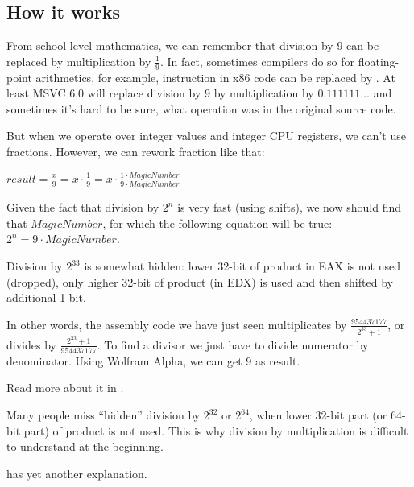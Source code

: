﻿\subsection{How it works}

From school-level mathematics, we can remember that division by 9 can be replaced by multiplication by $\frac{1}{9}$.
In fact, sometimes compilers do so for floating-point arithmetics, for example,  instruction in x86 code
can be replaced by .
At least MSVC 6.0 will replace division by 9 by multiplication by $0.111111...$ and sometimes it's hard to be sure,
what operation was in the original source code.

But when we operate over integer values and integer CPU registers, we can't use fractions.
However, we can rework fraction like that:

\begin{center}
$result = \frac{x}{9} = x \cdot \frac{1}{9} = x \cdot \frac{1 \cdot MagicNumber}{9 \cdot MagicNumber}$
\end{center}

Given the fact that division by $2^n$ is very fast (using shifts), we now should find that $MagicNumber$,
for which the following
equation will be true: $2^n = 9 \cdot MagicNumber$.

Division by $2^{33}$ is somewhat hidden: lower 32-bit of product in EAX is not used (dropped), only higher 32-bit of
product (in EDX) is used and then shifted by additional 1 bit.

In other words, the assembly code we have just seen multiplicates by {\Large $\frac{954437177}{{2^{33}+1}}$},
or divides by {\Large $\frac{{2^{33}+1}}{954437177}$}.
To find a divisor we just have to divide numerator by denominator.
Using Wolfram Alpha, we can get 9 as result.


Read more about it in .

Many people miss ``hidden'' division by $2^{32}$ or $2^{64}$,
when lower 32-bit part (or 64-bit part) of product is not used.
This is why division by multiplication is difficult to understand at the beginning.

\MathForProg has yet another explanation.

